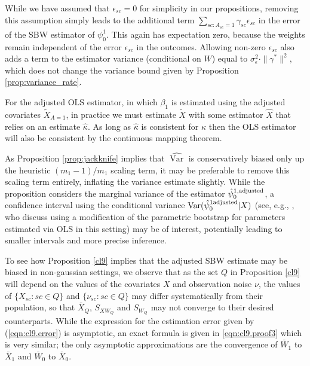 \begin{remark}
    While we have assumed that $\epsilon_{sc}=0$ for simplicity in our propositions, removing this assumption simply leads to the additional term $\sum_{sc: A_{sc} = 1}\gamma_{sc}\epsilon_{sc}$ in the error of the SBW estimator of $\psi_0^1$. This again has expectation zero, because the weights remain independent of the error $\epsilon_{sc}$ in the outcomes. Allowing non-zero $\epsilon_{sc}$ also adds a term to the estimator variance (conditional on $W$) equal to $\sigma^2_{\epsilon}\cdot \|\gamma^*\|^2$,    which does not change the variance bound given by Proposition \ref{prop:variance_rate}.
\end{remark}

\begin{remark}
    For the adjusted OLS estimator, in which $\beta_1$ is estimated using the adjusted covariates $\tilde{X}_{A=1}$, in practice we must estimate $\tilde{X}$ with some estimator $\hat{X}$ that relies on an estimate $\hat{\kappa}$. As long as $\hat{\kappa}$ is consistent for $\kappa$ then the OLS estimator will also be consistent by the continuous mapping theorem.
\end{remark}

\begin{remark}
As Proposition \ref{prop:jackknife} implies that $\hat{\operatorname{Var}}$ is conservatively biased only up the heuristic $(m_1-1)/m_1$ scaling term, it may be preferable to remove this scaling term entirely, inflating the variance estimate slightly. While the proposition considers the marginal variance of the estimator $\hat{\psi}_0^{1,\textup{adjusted}}$, a confidence interval using the conditional variance $\operatorname{Var}(\hat{\psi}_0^{1 \textup{adjusted}}|X)$ (see, e.g., \cite{buonaccorsi2010measurement}, who discuss using a modification of the parametric bootstrap for parameters estimated via OLS in this setting) may be of interest, potentially leading to smaller intervals and more precise inference. 
\end{remark}


\begin{remark}
To see how Proposition \ref{cl9} implies that the adjusted SBW estimate may be biased in non-gaussian settings, we observe that as the set $Q$ in Proposition \ref{cl9} will depend on the values of the covariates $X$ and observation noise $\nu$, the values of $\{X_{sc}: sc \in Q\}$ and $\{\nu_{sc}: sc \in Q\}$ may differ systematically from their population, so that $\bar{X}_Q$, $S_{XW_Q}$ and $S_{W_Q}$ may not converge to their desired counterparts. While the expression for the estimation error given by (\ref{eqn:cl9.error}) is asymptotic, an exact formula is given in \eqref{eqn:cl9.proof3} which is very similar; the only asymptotic approximations are the convergence of $\bar{W}_1$ to $\bar{X}_1$ and $\bar{W}_0$ to $\bar{X}_0$. 
\end{remark}

